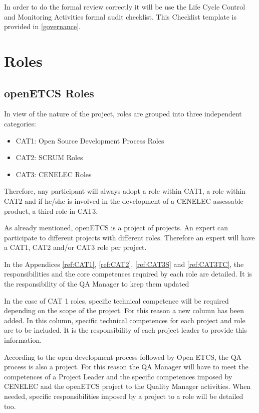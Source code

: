 \documentclass{template/openetcs_article}
\begin{document}
In order to do the formal review correctly it will be use the Life Cycle Control and Monitoring Activities formal audit checklist. This Checklist template is provided in \href{https://github.com/openETCS/governance/tree/master/Templates}{[governance]}.


\section{Roles}

\newcommand\todoin[2][]{\todo[inline, caption={2do}, #1]{
\begin{minipage}{\textwidth-4pt}#2\end{minipage}}}

\subsection{openETCS Roles}

In view of the nature of the project, roles are grouped into three independent categories:

\begin{itemize}
\item CAT1: Open Source Development Process Roles
\item CAT2: SCRUM Roles
\item CAT3: CENELEC Roles 
\end{itemize}

Therefore, any participant will always adopt a role within CAT1, a role within CAT2 and if he/she is involved in the development of a CENELEC assessable product, a third role in CAT3.

As already mentioned, openETCS is a project of projects. An expert can participate to different projects with different roles. Therefore an expert will have a CAT1, CAT2 and/or CAT3 role per project.

In the Appendices \ref{ref:CAT1}, \ref{ref:CAT2}, \ref{ref:CAT3S} and \ref{ref:CAT3TC}, the responsibilities and the core competences required by each role are detailed. It is the responsibility of the QA Manager to keep them updated

In the case of CAT 1 roles, specific technical competence will be required depending on the scope of the project. For this reason a new column has been added. In this column, specific technical competences for each project and role are to be included. It is the responsibility of each project leader to provide this information.

According to the open development process followed by Open \gls{ETCS}, the QA process is also a project. For this reason the QA Manager will have to meet the competences of a Project Leader and the specific competences imposed by CENELEC and the openETCS project to the Quality Manager activities. When needed, specific responsibilities imposed by a project to a role will be detailed too.
\end{document}
